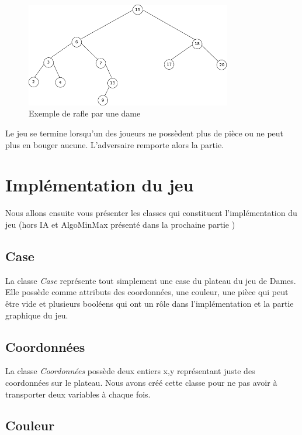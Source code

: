 \documentclass[12,french]{report}
\begin{document}
\begin{figure}[H]
	\center
	\includegraphics[width=0.8\textwidth]{./Images/arbre} %
	\caption{Exemple de rafle par une dame}
\end{figure}\vspace{0.2cm}

Le jeu se termine lorsqu'un des joueurs ne possèdent plus de pièce ou ne peut plus en bouger aucune. L'adversaire remporte alors la partie.

\section{Implémentation du jeu}

 Nous allons ensuite vous présenter les classes qui constituent l'implémentation du jeu (hors IA et AlgoMinMax présenté dans la prochaine partie )

\subsection{Case}

La classe \textit{Case} représente tout simplement une case du plateau du jeu de Dames. Elle possède comme attributs des coordonnées, une couleur, une pièce qui peut être vide et plusieurs booléens qui ont un rôle dans l'implémentation et la partie graphique du jeu.
  
\subsection{Coordonnées}

La classe \textit{Coordonnées} possède deux entiers x,y représentant juste des coordonnées sur le plateau. Nous avons créé cette classe pour ne pas avoir à transporter deux variables à chaque fois.

\subsection{Couleur}
\end{document}

